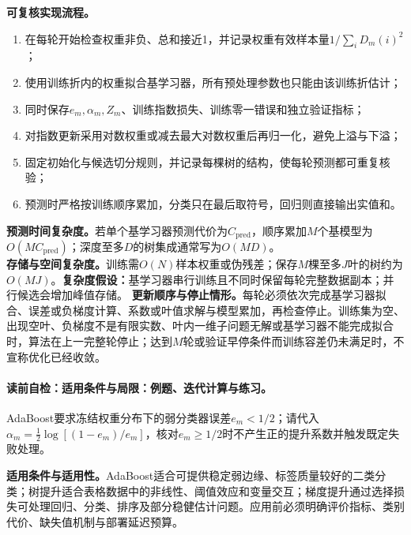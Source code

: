 \label{struct:V3-C03-CH27}
\textbf{可复核实现流程。}
\begin{enumerate}[leftmargin=2.2em]
  \item 在每轮开始检查权重非负、总和接近1，并记录权重有效样本量$1/\sum_iD_m(i)^2$；
  \item 使用训练折内的权重拟合基学习器，所有预处理参数也只能由该训练折估计；
  \item 同时保存$e_m,\alpha_m,Z_m$、训练指数损失、训练零一错误和独立验证指标；
  \item 对指数更新采用对数权重或减去最大对数权重后再归一化，避免上溢与下溢；
  \item 固定初始化与候选切分规则，并记录每棵树的结构，使每轮预测都可重复核验；
  \item 预测时严格按训练顺序累加，分类只在最后取符号，回归则直接输出实值和。
\end{enumerate}

\begin{complexitybox}
\textbf{预测时间复杂度。}若单个基学习器预测代价为$C_{\mathrm{pred}}$，顺序累加$M$个基模型为$O(MC_{\mathrm{pred}})$；深度至多$D$的树集成通常写为$O(MD)$。\\
\textbf{存储与空间复杂度。}训练需$O(N)$样本权重或伪残差；保存$M$棵至多$J$叶的树约为$O(MJ)$。\textbf{复杂度假设：}基学习器串行训练且不同时保留每轮完整数据副本；并行候选会增加峰值存储。
\textbf{更新顺序与停止情形。}每轮必须依次完成基学习器拟合、误差或负梯度计算、系数或叶值求解与模型累加，再检查停止。训练集为空、出现空叶、负梯度不是有限实数、叶内一维子问题无解或基学习器不能完成拟合时，算法在上一完整轮停止；达到$M$轮或验证早停条件而训练容差仍未满足时，不宣称优化已经收敛。
\end{complexitybox}

\begingroup
{}
\label{struct:V3-C03-CH29}
\paragraph{读前自检：适用条件与局限：例题、迭代计算与练习。}AdaBoost要求冻结权重分布下的弱分类器误差$e_m<1/2$；请代入$\alpha_m=\tfrac12\log[(1-e_m)/e_m]$，核对$e_m\ge1/2$时不产生正的提升系数并触发既定失败处理。\par

\begin{applicabilitybox}
\textbf{适用条件与适用性。}AdaBoost适合可提供稳定弱边缘、标签质量较好的二类分类；树提升适合表格数据中的非线性、阈值效应和变量交互；梯度提升通过选择损失可处理回归、分类、排序及部分稳健估计问题。应用前必须明确评价指标、类别代价、缺失值机制与部署延迟预算。
\end{applicabilitybox}

